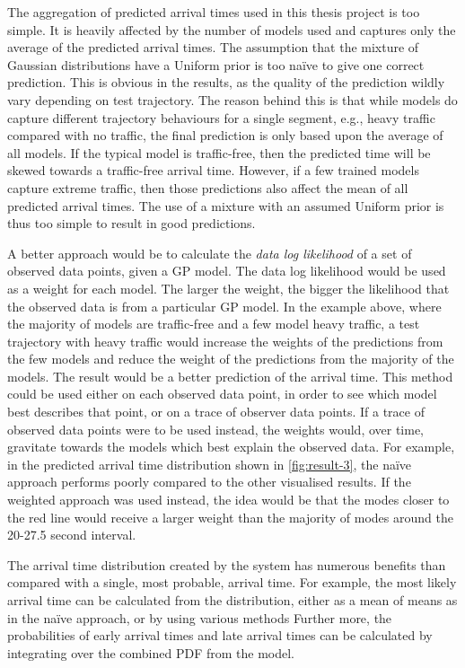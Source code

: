 The aggregation of predicted arrival times used in this thesis project is too simple.
It is heavily affected by the number of models used and captures only the average of the predicted arrival times.
The assumption that the mixture of Gaussian distributions have a Uniform prior is too naïve to give one correct prediction.
This is obvious in the results, as the quality of the prediction wildly vary depending on test trajectory.
The reason behind this is that while models do capture different trajectory behaviours for a single segment, e.g., heavy traffic compared with no traffic, the final prediction is only based upon the average of all models.
If the typical model is traffic-free, then the predicted time will be skewed towards a traffic-free arrival time.
However, if a few trained models capture extreme traffic, then those predictions also affect the mean of all predicted arrival times.
The use of a mixture with an assumed Uniform prior is thus too simple to result in good predictions.

A better approach would be to calculate the \textit{data log likelihood} of a set of observed data points, given a GP model.
The data log likelihood would be used as a weight for each model.
The larger the weight, the bigger the likelihood that the observed data is from a particular GP model.
In the example above, where the majority of models are traffic-free and a few model heavy traffic, a test trajectory with heavy traffic would increase the weights of the predictions from the few models and reduce the weight of the predictions from the majority of the models.
The result would be a better prediction of the arrival time.
This method could be used either on each observed data point, in order to see which model best describes that point, or on a trace of observer data points.
If a trace of observed data points were to be used instead, the weights would, over time, gravitate towards the models which best explain the observed data.
For example, in the predicted arrival time distribution shown in \ref{fig:result-3}, the naïve approach performs poorly compared to the other visualised results.
If the weighted approach was used instead, the idea would be that the modes closer to the red line would receive a larger weight than the majority of modes around the 20-27.5 second interval.

The arrival time distribution created by the system has numerous benefits than compared with a single, most probable, arrival time.
For example, the most likely arrival time can be calculated from the distribution, either as a mean of means as in the naïve approach, or by using various methods \cite{Carreira2000, Comaniciu2002, Pulkkinen2013}
Further more, the probabilities of early arrival times and late arrival times can be calculated by integrating over the combined PDF from the model.

